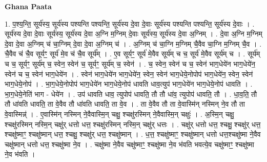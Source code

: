 \documentclass[17pt]{extarticle}
\begin{document}
\textbf{Ghana Paata } \newline

1. प॒श्य॒न्ति॒ सूर्य॑स्य॒ सूर्य॑स्य पश्यन्ति पश्यन्ति॒ सूर्य॑स्य दे॒वा दे॒वाः सूर्य॑स्य पश्यन्ति पश्यन्ति॒ सूर्य॑स्य दे॒वाः । . सूर्य॑स्य दे॒वा दे॒वाः सूर्य॑स्य॒ सूर्य॑स्य दे॒वा अ॒ग्नि म॒ग्निम् दे॒वाः सूर्य॑स्य॒ सूर्य॑स्य दे॒वा अ॒ग्निम् । . दे॒वा अ॒ग्नि म॒ग्निम् दे॒वा दे॒वा अ॒ग्निम् च॑ चा॒ग्निम् दे॒वा दे॒वा अ॒ग्निम् च॑ । . अ॒ग्निम् च॑ चा॒ग्नि म॒ग्निम् चै॒वैव चा॒ग्नि म॒ग्निम् चै॒व । . चै॒वैव च॑ चै॒व सूर्यꣳ॒॒ सूर्य॑ मे॒व च॑ चै॒व सूर्य᳚म् । . ए॒व सूर्यꣳ॒॒ सूर्य॑ मे॒वैव सूर्य॑म् च च॒ सूर्य॑ मे॒वैव सूर्य॑म् च । . सूर्य॑म् च च॒ सूर्यꣳ॒॒ सूर्य॑म् च॒ स्वेन॒ स्वेन॑ च॒ सूर्यꣳ॒॒ सूर्य॑म् च॒ स्वेन॑ । . च॒ स्वेन॒ स्वेन॑ च च॒ स्वेन॑ भाग॒धेये॑न भाग॒धेये॑न॒ स्वेन॑ च च॒ स्वेन॑ भाग॒धेये॑न । . स्वेन॑ भाग॒धेये॑न भाग॒धेये॑न॒ स्वेन॒ स्वेन॑ भाग॒धेये॒नोपोप॑ भाग॒धेये॑न॒ स्वेन॒ स्वेन॑ भाग॒धेये॒नोप॑ । . भा॒ग॒धेये॒नोपोप॑ भाग॒धेये॑न भाग॒धेये॒नोप॑ धावति धाव॒त्युप॑ भाग॒धेये॑न भाग॒धेये॒नोप॑ धावति । . भा॒ग॒धेये॒नेति॑ भाग - धेये॑न । . उप॑ धावति धाव॒ त्युपोप॑ धावति॒ तौ तौ धा॑व॒ त्युपोप॑ धावति॒ तौ । . धा॒व॒ति॒ तौ तौ धा॑वति धावति॒ ता वे॒वैव तौ धा॑वति धावति॒ ता वे॒व । . ता वे॒वैव तौ ता वे॒वास्मि॑न् नस्मिन् ने॒व तौ ता वे॒वास्मिन्न्॑ । . ए॒वास्मि॑न् नस्मिन् ने॒वैवास्मि॒न् चक्षु॒ श्चक्षु॑रस्मिन् ने॒वैवास्मि॒न् चक्षुः॑ । . अ॒स्मि॒न् चक्षु॒ श्चक्षु॑रस्मिन् नस्मि॒न् चक्षु॑र् धत्तो धत्त॒ श्चक्षु॑रस्मिन् नस्मि॒न् चक्षु॑र् धत्तः । . चक्षु॑र् धत्तो धत्त॒ श्चक्षु॒ श्चक्षु॑र् धत्त॒ श्चक्षु॑ष्माꣳ॒॒ श्चक्षु॑ष्मान् धत्त॒ श्चक्षु॒ श्चक्षु॑र् धत्त॒ श्चक्षु॑ष्मान् । . ध॒त्त॒ श्चक्षु॑ष्माꣳ॒॒ श्चक्षु॑ष्मान् धत्तो धत्त॒श्चक्षु॑ष्मा ने॒वैव चक्षु॑ष्मान् धत्तो धत्त॒ श्चक्षु॑ष्मा ने॒व । . चक्षु॑ष्मा ने॒वैव चक्षु॑ष्माꣳ॒॒ श्चक्षु॑ष्मा ने॒व भ॑वति भवत्ये॒व चक्षु॑ष्माꣳ॒॒ श्चक्षु॑ष्मा ने॒व भ॑वति । \newline
\end{document}
